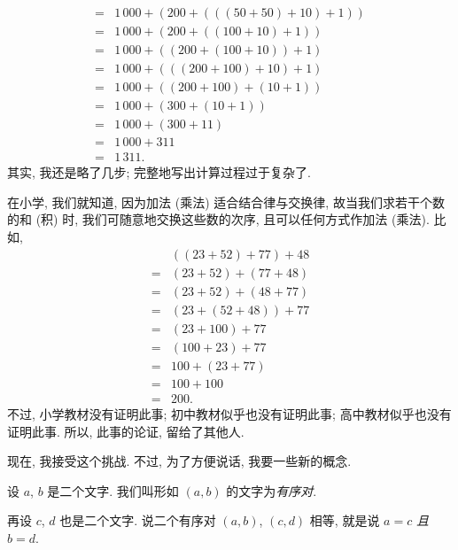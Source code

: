 \begin{example}
\begin{align*}
        = {} & 1\,000 + (200 + (((50 + 50) + 10) + 1))        \\
        = {} & 1\,000 + (200 + ((100 + 10) + 1))              \\
        = {} & 1\,000 + ((200 + (100 + 10)) + 1)              \\
        = {} & 1\,000 + (((200 + 100) + 10) + 1)              \\
        = {} & 1\,000 + ((200 + 100) + (10 + 1))              \\
        = {} & 1\,000 + (300 + (10 + 1))                      \\
        = {} & 1\,000 + (300 + 11)                            \\
        = {} & 1\,000 + 311                                   \\
        = {} & 1\,311.
    \end{align*}
    其实, 我还是略了几步;
    完整地写出计算过程过于复杂了.
\end{example}

在小学, 我们就知道, 因为加法 (乘法)
适合结合律与交换律,
故当我们求若干个数的和 (积) 时,
我们可随意地交换这些数的次序,
且可以任何方式作加法 (乘法).
比如,
\begin{align*}
         & ((23 + 52) + 77) + 48 \\
    = {} & (23 + 52) + (77 + 48) \\
    = {} & (23 + 52) + (48 + 77) \\
    = {} & (23 + (52 + 48)) + 77 \\
    = {} & (23 + 100) + 77       \\
    = {} & (100 + 23) + 77       \\
    = {} & 100 + (23 + 77)       \\
    = {} & 100 + 100             \\
    = {} & 200.
\end{align*}
不过, 小学教材没有证明此事;
初中教材似乎也没有证明此事;
高中教材似乎也没有证明此事.
所以, 此事的论证, 留给了其他人.

现在, 我接受这个挑战.
不过, 为了方便说话, 我要一些新的概念.

\begin{definition}
    设 \(a\), \(b\) 是二个文字.
    我们叫形如 \((a, b)\) 的文字为\emph{有序对}.

    再设 \(c\), \(d\) 也是二个文字.
    说二个有序对 \((a, b)\), \((c, d)\) 相等,
    就是说 \(a = c\) \emph{且} \(b = d\).
\end{definition}


